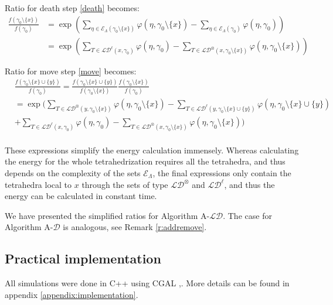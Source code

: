 Ratio for death step \eqref{death} becomes:
\begin{align*}
\frac{f(\gamma_0 \setminus\{x\})}{f(\gamma_0)}&= \exp\left({\sum_{\eta\in \mathcal E_\Lambda(\gamma_0 \setminus\{x\})} \varphi(\eta,\gamma_0 \setminus\{x\})- \sum_{\eta\in \mathcal E_\Lambda(\gamma_0)}\varphi(\eta,\gamma_0)}\right)\\
&= \exp\left( \sum_{T\in \mathcal {LD}^\ell (x,\gamma_0)} \varphi(\eta,\gamma_0) - \sum_{T \in \mathcal {LD}^\otimes (x,\gamma_0 \setminus\{x\} )} \varphi(\eta,\gamma_0 \setminus\{x\})   \right)
\end{align*}

Ratio for move step \eqref{move} becomes:
\begin{align*}
& \frac{f(\gamma_0 \setminus\{x\} \cup\{y\})}{f(\gamma_0)}= 
\frac{f(\gamma_0 \setminus\{x\} \cup\{y\})}{f(\gamma_0 \setminus\{x\})} \frac{f(\gamma_0 \setminus\{x\})}{f(\gamma_0)} \\ 
&= \exp \Bigg(  \sum_{T \in \mathcal {LD}^\otimes (y,\gamma_0 \setminus\{x\})} \varphi(\eta,\gamma_0 \setminus\{x\})  - \sum_{T\in \mathcal {LD}^\ell (y,\gamma_0 \setminus\{x\} \cup\{y\})} \varphi(\eta,\gamma_0 \setminus\{x\} \cup\{y\})  \\
&+ \sum_{T\in \mathcal {LD}^\ell (x,\gamma_0)} \varphi(\eta,\gamma_0) - \sum_{T \in \mathcal {LD}^\otimes (x,\gamma_0 \setminus\{x\})} \varphi(\eta,\gamma_0 \setminus\{x\}) \Bigg) \\
\end{align*}


These expressions simplify the energy calculation immensely. Whereas calculating the energy for the whole tetrahedrization requires all the tetrahedra, and thus depends on the complexity of the sets $\mathcal E_\Lambda$, the final expressions only contain the tetrahedra local to $x$ through the sets of type $\mathcal {LD}^\otimes$ and $\mathcal {LD}^\ell$, and thus the energy can be calculated in constant time.

We have presented the simplified ratios for Algorithm A-$\mathcal {LD}$. The case for Algorithm A-$\mathcal D$ is analogous, see Remark \ref{r:addremove}.

\subsection{Practical implementation}\label{sec:practical}
All simulations were done in C++ using CGAL \cite{cgal},\cite{cgal:3d-triang}. More details can be found in appendix \ref{appendix:implementation}.
